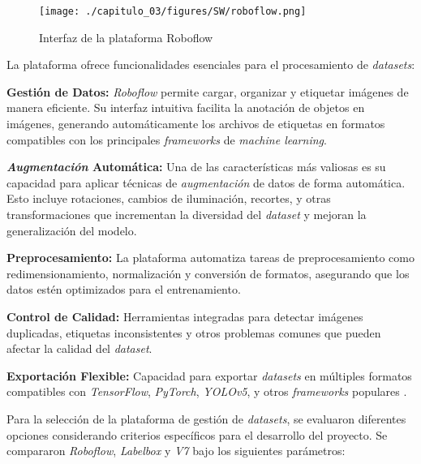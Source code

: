 \begin{figure}[H]
\leavevmode
\begin{minipage}{\textwidth}
\begin{center}
\texttt{[image: ./capitulo\_03/figures/SW/roboflow.png]}
\caption{Interfaz de la plataforma Roboflow\label{fig:roboflow}}
\end{center}
\end{minipage}
\end{figure}

La plataforma ofrece funcionalidades esenciales para el procesamiento de \textit{datasets}:

\textbf{Gestión de Datos:} \textit{Roboflow} permite cargar, organizar y etiquetar imágenes de manera eficiente. Su interfaz intuitiva facilita la anotación de objetos en imágenes, generando automáticamente los archivos de etiquetas en formatos compatibles con los principales \textit{frameworks} de \textit{machine learning}.

\textbf{\textit{Augmentación} Automática:} Una de las características más valiosas es su capacidad para aplicar técnicas de \textit{augmentación} de datos de forma automática. Esto incluye rotaciones, cambios de iluminación, recortes, y otras transformaciones que incrementan la diversidad del \textit{dataset} y mejoran la generalización del modelo.

\textbf{Preprocesamiento:} La plataforma automatiza tareas de preprocesamiento como redimensionamiento, normalización y conversión de formatos, asegurando que los datos estén optimizados para el entrenamiento.

\textbf{Control de Calidad:} Herramientas integradas para detectar imágenes duplicadas, etiquetas inconsistentes y otros problemas comunes que pueden afectar la calidad del \textit{dataset}.

\textbf{Exportación Flexible:} Capacidad para exportar \textit{datasets} en múltiples formatos compatibles con \textit{TensorFlow}, \textit{PyTorch}, \textit{YOLOv5}, y otros \textit{frameworks} populares \cite{Roboflow2023}.

Para la selección de la plataforma de gestión de \textit{datasets}, se evaluaron diferentes opciones considerando criterios específicos para el desarrollo del proyecto. Se compararon \textit{Roboflow}, \textit{Labelbox} y \textit{V7} bajo los siguientes parámetros:

